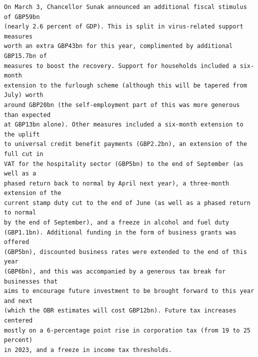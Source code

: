 \documentclass[10pt, letterpaper]{article}
\begin{document}
\begin{spacing}{1.4}
\begin{scriptsize}
\begin{spacing}{.85}
\begin{verbatim}
On March 3, Chancellor Sunak announced an additional fiscal stimulus of GBP59bn
(nearly 2.6 percent of GDP). This is split in virus-related support measures
worth an extra GBP43bn for this year, complimented by additional GBP15.7bn of
measures to boost the recovery. Support for households included a six-month
extension to the furlough scheme (although this will be tapered from July) worth
around GBP20bn (the self-employment part of this was more generous than expected
at GBP13bn alone). Other measures included a six-month extension to the uplift
to universal credit benefit payments (GBP2.2bn), an extension of the full cut in
VAT for the hospitality sector (GBP5bn) to the end of September (as well as a
phased return back to normal by April next year), a three-month extension of the
current stamp duty cut to the end of June (as well as a phased return to normal
by the end of September), and a freeze in alcohol and fuel duty
(GBP1.1bn). Additional funding in the form of business grants was offered
(GBP5bn), discounted business rates were extended to the end of this year
(GBP6bn), and this was accompanied by a generous tax break for businesses that
aims to encourage future investment to be brought forward to this year and next
(which the OBR estimates will cost GBP12bn). Future tax increases centered
mostly on a 6-percentage point rise in corporation tax (from 19 to 25 percent)
in 2023, and a freeze in income tax thresholds.



\end{verbatim}
\end{spacing}
\end{scriptsize}
\end{spacing}
\end{document}
